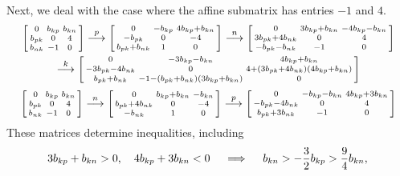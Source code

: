 \documentclass{amsart}
\theoremstyle{definition}
\theoremstyle{remark}
\numberwithin{equation}{section}
\newcommand{\0}{{\mathbf{0}}}
\begin{document}
Next, we deal with the case where the affine submatrix has entries $-1$ and $4$.
\begin{multline*}
\begin{bsmallmatrix*}
	0 & b_{kp} & b_{kn} \\
	b_{pk} & 0 & 4	 \\
	b_{nk} & -1 & 0
\end{bsmallmatrix*}
\overset{p}{\longrightarrow}
\begin{bsmallmatrix*}
	0 & -b_{kp} & 4b_{kp}+b_{kn} \\
	-b_{pk} & 0 & -4 \\
	b_{pk}+b_{nk}& 1 & 0
\end{bsmallmatrix*}
\overset{n}{\longrightarrow}
\begin{bsmallmatrix*}
	0 & 3b_{kp}+b_{kn}& -4b_{kp}-b_{kn} \\
	3b_{pk}+4b_{nk} & 0 & 4 \\
	-b_{pk}-b_{nk}& -1 & 0
\end{bsmallmatrix*}\\
\overset{k}{\longrightarrow}
\begin{bsmallmatrix*}
	0 & -3b_{kp}-b_{kn}& 4b_{kp}+b_{kn} \\
	-3b_{pk}-4b_{nk} & 0 & 4+(3b_{pk}+4b_{nk})(4b_{kp}+b_{kn}) \\
	b_{pk}+b_{nk}& -1-(b_{pk}+b_{nk})(3b_{kp}+b_{kn}) & 0
\end{bsmallmatrix*}
\end{multline*}
\begin{multline*}
\begin{bsmallmatrix*}
	0 & b_{kp} & b_{kn} \\
	b_{pk} & 0 & 4	 \\
	b_{nk} & -1 & 0
\end{bsmallmatrix*}\overset{n}{\longrightarrow}
\begin{bsmallmatrix*}
	0 & b_{kp}+b_{kn} & -b_{kn} \\
	b_{pk}+4b_{nk} & 0 & -4	 \\
	-b_{nk} & 1 & 0
\end{bsmallmatrix*}\overset{p}{\longrightarrow}
\begin{bsmallmatrix*}
	0 & -b_{kp}-b_{kn} & 4b_{kp}+3b_{kn} \\
	-b_{pk}-4b_{nk} & 0 & 4	 \\
	b_{pk}+3b_{nk} & -1 & 0
\end{bsmallmatrix*}
\end{multline*}
These matrices determine inequalities, including
\[
3b_{kp}+b_{kn}>0,\quad 4b_{kp}+3b_{kn}<0\quad \implies\quad b_{kn}>-\frac32b_{kp}>\frac94b_{kn},\\
\]
\end{document}
